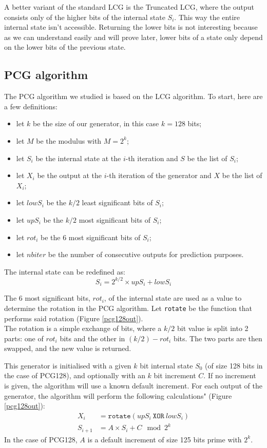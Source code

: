 \documentclass[preprint]{iacrtrans}
\begin{document}
A better variant of the standard LCG is the Truncated LCG, where the output consists only of the higher bits of the internal state $S_i$. This way the entire internal state isn't accessible. Returning the lower bits is not interesting because as we can understand easily and will prove later, lower bits of a state only depend on the lower bits of the previous state.

\subsection{PCG algorithm}

The PCG algorithm we studied is based on the LCG algorithm. To start, here are a few definitions:
\begin{itemize}
    \item let $k$ be the size of our generator, in this case $k = 128$ bits;
    \item let $M$ be the modulus with $M = 2^k$;
    \item let $S_i$ be the internal state at the $i$-th iteration and $S$ be the list of $S_i$;
    \item let $X_i$ be the output at the $i$-th iteration of the generator and $X$ be the list of $X_i$;
    \item let $lowS_i$ be the $k/2$ least significant bits of $S_i$;
    \item let $upS_i$ be the $k/2$ most significant bits of $S_i$;
    \item let $rot_i$ be the 6 most significant bits of $S_i$;
    \item let $nbiter$ be the number of consecutive outputs for prediction purposes.
\end{itemize}

The internal state can be redefined as:
\begin{equation}
    S_i = 2^{k/2} \times upS_i + lowS_i 
\end{equation}

The 6 most significant bits, $rot_i$, of the internal state are used as a value to determine the rotation in the PCG algorithm. Let \texttt{rotate} be the function that performs said rotation (Figure \ref{pcg128out}).\\
The rotation is a simple exchange of bits, where a $k/2$ bit value is split into 2 parts: one of $rot_i$ bits and the other in $(k/2) - rot_i$ bits. The two parts are then swapped, and the new value is returned. 

This generator is initialised with a given $k$ bit internal state $S_0$ (of size 128 bits in the case of PCG128), and optionally with an $k$ bit increment $C$. If no increment is given, the algorithm will use a known default increment. For each output of the generator, the algorithm will perform the following calculations" (Figure \ref{pcg128out}):\\
\begin{align}
    X_{i} &= \mathtt{rotate}(upS_i\ \mathtt{XOR}\ lowS_i)\\
    S_{i+1} &= A \times S_{i} + C \mod{2^k}
\end{align}
In the case of PCG128, $A$ is a default increment of size 125 bits prime with $2^k$.
\end{document}
